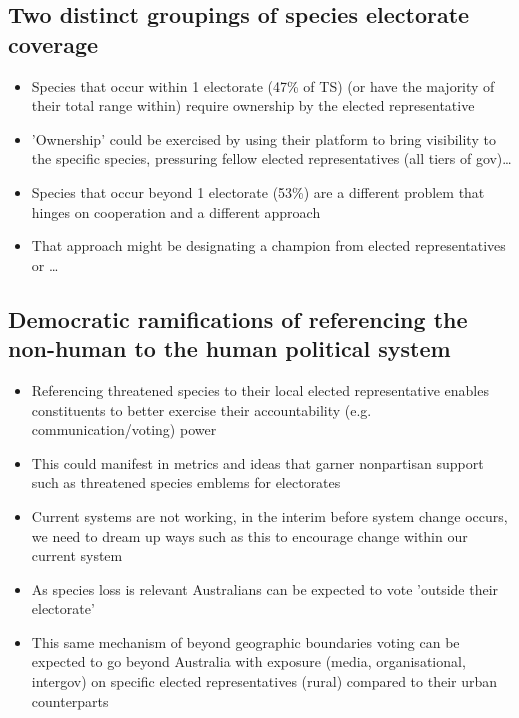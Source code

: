 \documentclass[a4paper,11pt]{article}
\begin{document}
\subsection{Two distinct groupings of species electorate coverage}

\begin{itemize}
    \item Species that occur within 1 electorate (47\% of TS) (or have the majority of their total range within) require ownership by the elected representative
    \item 'Ownership' could be exercised by using their platform to bring visibility to the specific species, pressuring fellow elected representatives (all tiers of gov)\ldots
    \item Species that occur beyond 1 electorate (53\%) are a different problem that hinges on cooperation and a different approach
    \item That approach might be designating a champion from elected representatives or \ldots
\end{itemize}

\subsection{Democratic ramifications of referencing the non-human to the human political system}

\begin{itemize}
    \item Referencing threatened species to their local elected representative enables constituents to better exercise their accountability (e.g. communication/voting) power
    \item This could manifest in metrics and ideas that garner nonpartisan support such as threatened species emblems for electorates
    \item Current systems are not working, in the interim before system change occurs, we need to dream up ways such as this to encourage change within our current system
    \item As species loss is relevant Australians can be expected to vote 'outside their electorate'
    \item This same mechanism of beyond geographic boundaries voting can be expected to go beyond Australia with exposure (media, organisational, intergov) on specific elected representatives (rural) compared to their urban counterparts
\end{itemize}
\end{document}
